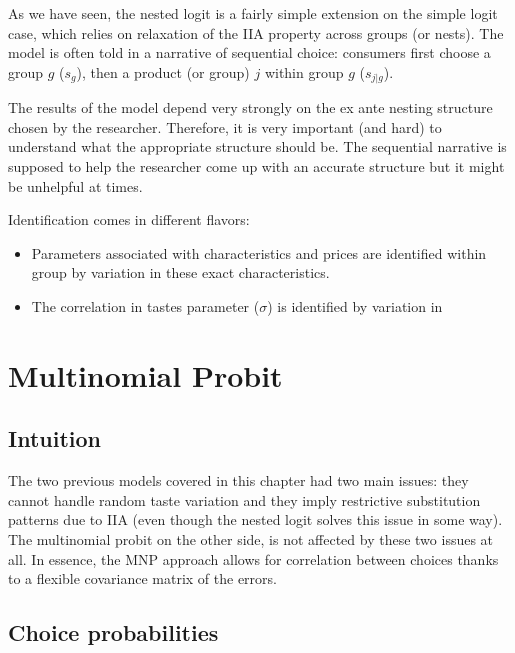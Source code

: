 As we have seen, the nested logit is a fairly simple extension on the simple logit case, which relies on relaxation of the IIA property across groups (or nests). The model is often told in a narrative of sequential choice: consumers first choose a group $g$ ($s_g$), then a product (or group) $j$ within group $g$ ($s_{j\vert g}$). 

The results of the model depend very strongly on the ex ante nesting structure chosen by the researcher. Therefore, it is very important (and hard) to understand what the appropriate structure should be. The sequential narrative is supposed to help the researcher come up with an accurate structure but it might be unhelpful at times.

Identification comes in different flavors:\begin{itemize}
\item Parameters associated with characteristics and prices are identified within group by variation in these exact characteristics.
\item The correlation in tastes parameter ($\sigma$) is identified by variation in 
\end{itemize}

\section{Multinomial Probit}

\subsection{Intuition}

The two previous models covered in this chapter had two main issues: they cannot handle random taste variation and they imply restrictive substitution patterns due to IIA (even though the nested logit solves this issue in some way). The multinomial probit on the other side, is not affected by these two issues at all. In essence, the MNP approach allows for correlation between choices thanks to a flexible covariance matrix of the errors.

\subsection{Choice probabilities}

